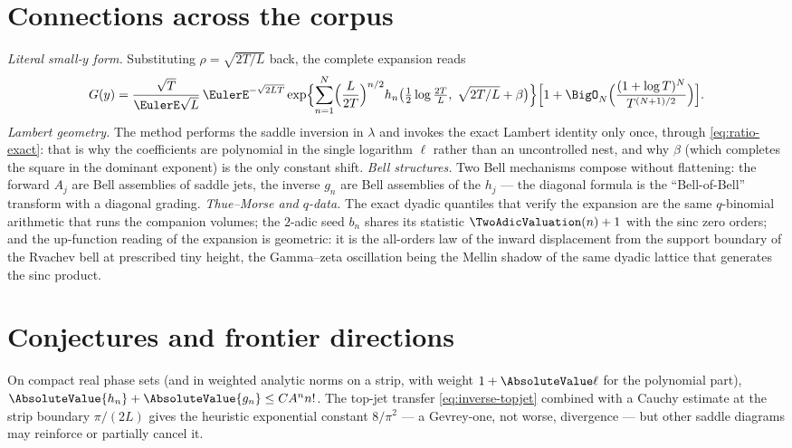 \documentclass[11pt,oneside]{article}
\numberwithin{equation}{section}
\theoremstyle{definition}
\theoremstyle{remark}
\begin{document}
\section{Connections across the corpus}
\label{sec:connections-inv}

\emph{Literal small-$y$ form.}  Substituting
$\rho=\sqrt{2T/L}$ back, the complete expansion reads
\begin{equation}
 G(y)=\frac{\sqrt T}{\EulerE\sqrt L}\,\EulerE^{-\sqrt{2LT}}
 \exp\Bigl\{\sum_{n=1}^{N}
 \Bigl(\frac{L}{2T}\Bigr)^{n/2}
 h_n\bigl(\tfrac12\log\tfrac{2T}L,\;
 \sqrt{2T/L}+\beta\bigr)\Bigr\}
 \Bigl[1+\BigO_N\Bigl(\frac{(1+\log T)^{N}}{T^{(N+1)/2}}\Bigr)\Bigr].
 \label{eq:literal}
\end{equation}
\emph{Lambert geometry.}  The method performs the saddle inversion in
$\lambda$ and invokes the exact Lambert identity only once, through
\eqref{eq:ratio-exact}: that is why the coefficients are polynomial
in the single logarithm $\ell$ rather than an uncontrolled nest, and
why $\beta$ (which completes the square in the dominant exponent) is
the only constant shift.  \emph{Bell structures.}  Two Bell
mechanisms compose without flattening: the forward
$A_j$ are Bell assemblies of saddle jets, the inverse $g_n$ are Bell
assemblies of the $h_j$ --- the diagonal formula is the
``Bell-of-Bell'' transform with a diagonal grading.
\emph{Thue--Morse and $q$-data.}  The exact dyadic quantiles that
verify the expansion are the same $q$-binomial arithmetic that runs
the companion volumes; the $2$-adic seed
$b_n$ shares its statistic $\TwoAdicValuation(n)+1$ with the sinc zero orders;
and the up-function reading of the expansion is geometric: it is the
all-orders law of the inward displacement from the support boundary
of the Rvachev bell at prescribed tiny height, the Gamma--zeta
oscillation being the Mellin shadow of the same dyadic lattice that
generates the sinc product.

\section{Conjectures and frontier directions}
\label{sec:conjectures-inv}

\begin{conjecture}
\label{conj:gevrey}
On compact real phase sets (and in weighted analytic norms on a
strip, with weight $1+\AbsoluteValue\ell$ for the polynomial part),
$\AbsoluteValue{h_n}+\AbsoluteValue{g_n}\le CA^{n}n!$.  The top-jet transfer
\eqref{eq:inverse-topjet} combined with a Cauchy estimate at the
strip boundary $\pi/(2L)$ gives the heuristic exponential constant
$8/\pi^{2}$ --- a Gevrey-one, not worse, divergence --- but other
saddle diagrams may reinforce or partially cancel it.
\end{conjecture}
\end{document}
